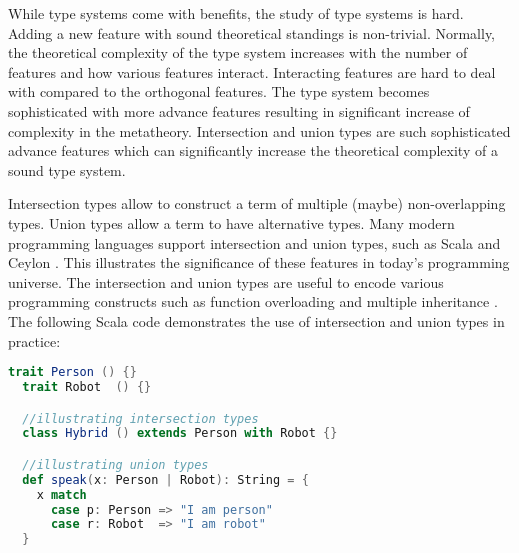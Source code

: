 While type systems come with benefits, the study of 
type systems is hard.
Adding a new 
feature with sound theoretical standings is non-trivial.
Normally, the theoretical complexity of the type system 
increases with the number of features and how 
various features interact.
Interacting features are hard to deal with compared 
to the orthogonal features. The type system becomes
sophisticated with more advance features resulting in
significant increase of complexity in the metatheory.
Intersection and union types
\citep{barbanera1995intersection,dunfield2014elaborating,muehlboeck2018empowering,pierce2002programming} 
are such sophisticated advance features which can 
significantly increase the theoretical 
complexity of a sound type system.


Intersection types allow
to construct a term of multiple (maybe) 
non-overlapping types. Union types 
allow a term to have alternative types.
Many modern programming languages support intersection 
and union types, such as Scala \citep{scala3doc}
and Ceylon \citep{king2013ceylon}.
This illustrates the 
significance of these features in today's 
programming universe. The intersection and 
union types are useful to encode various
programming constructs such as function overloading 
\citep{castagna1995calculus, cardelli1985understanding, wadler1989make}
and multiple inheritance \citep{compagnoni1996higher}.
The following Scala
code demonstrates the use of intersection
and union types in practice:

\begin{lstlisting}[language=Scala]
  trait Person () {}
  trait Robot  () {}

  //illustrating intersection types
  class Hybrid () extends Person with Robot {}

  //illustrating union types
  def speak(x: Person | Robot): String = {
    x match
      case p: Person => "I am person"
      case r: Robot  => "I am robot"
  }
\end{lstlisting}

